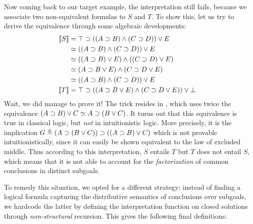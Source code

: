 Now coming back to our target example,
the interpretation still fails, because we associate two non-equivalent
formulas to $S$ and $T$. To show this, let us try to derive the equivalence
through some algebraic developments:
\begin{align}
  \sint{S} &= \top \limp ((A \limp B) \land (C \limp D)) \lor E \nonumber\\
              &\semequiv ((A \limp B) \land (C \limp D)) \lor E \nonumber\\
              &\semequiv ((A \limp B) \lor E) \land ((C \limp D) \lor E) \nonumber\\
              &\semequiv (A \limp B \lor E) \land (C \limp D \lor E) \labeq{grishin}\\
              &\semequiv ((A \limp B) \land (C \limp D)) \lor E \nonumber\\
  \sint{T} &= \top \limp ((A \limp B \lor E) \land (C \limp D \lor E)) \lor \bot \nonumber
\end{align}
Wait, we did manage to prove it! The trick resides in , which
uses twice the equivalence $(A \supset B) \lor C \simeq A \supset (B \lor C)$. It
turns out that this equivalence is true in classical logic, but \emph{not} in
intuitionistic logic. More precisely, it is the implication $G \triangleq (A \supset
(B \lor C)) \supset ((A \supset B) \lor C)$ which is not provable
intuitionistically, since it can easily be shown equivalent to the law of
excluded middle. Thus according to this interpretation, $S$
entails $T$ but $T$ does not entail $S$, which means that it is not able to
account for the \emph{factorization} of common conclusions in distinct subgoals.

To remedy this situation, we opted for a different strategy: instead of finding
a logical formula capturing the distributive semantics of conclusions over
subgoals, we hardcode the latter by defining the interpretation function on
closed solutions through \emph{non-structural} recursion. This gives the
following final definitions:

